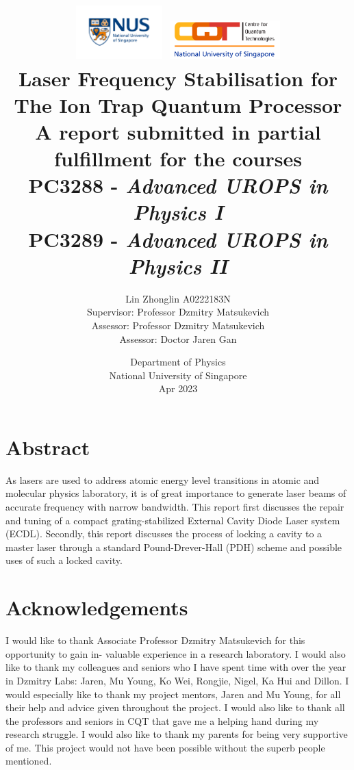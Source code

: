 \documentclass[12pt]{report}
\title{
\includegraphics[width=0.25\textwidth]{nus_logo.jpeg}
\includegraphics[width=0.32\textwidth]{cqt_logo.png}\\
{\LARGE \textbf{Laser Frequency Stabilisation for The Ion Trap Quantum Processor}}\\
\vspace{5mm}
{\normalsize A report submitted in partial fulfillment for the courses}\\
{\normalsize PC3288 - \textit{Advanced UROPS in Physics I}}\\
{\normalsize PC3289 - \textit{Advanced UROPS in Physics II}}
}
\author{
{\normalsize Lin Zhonglin \hspace{10mm} A0222183N}\\
\vspace{1mm}
{\normalsize Supervisor: Professor Dzmitry Matsukevich}\\
{\normalsize Assessor: Professor Dzmitry Matsukevich}\\
{\normalsize Assessor: Doctor Jaren Gan }}\\
\date{{\normalsize Department of Physics}\\
{\normalsize National University of Singapore}\\
{\normalsize Apr 2023}}
\begin{document}
\maketitle

\chapter*{Abstract}
As lasers are used to address atomic energy level transitions in atomic and molecular physics laboratory, it is of great importance to generate laser beams of accurate frequency with narrow bandwidth. This report first discusses the repair and tuning of a compact grating-stabilized External Cavity Diode Laser system (ECDL). Secondly, this report discusses the process of locking a cavity to a master laser through a standard Pound-Drever-Hall (PDH) scheme and possible uses of such a locked cavity. 


\chapter*{Acknowledgements}
I would like to thank Associate Professor Dzmitry Matsukevich for this opportunity to gain in- valuable experience in a research laboratory.
I would also like to thank my colleagues and seniors who I have spent time with over the year in Dzmitry Labs: Jaren, Mu Young, Ko Wei, Rongjie, Nigel, Ka Hui and Dillon. I would especially like to thank my project mentors, Jaren and Mu Young, for all their help and advice given throughout the project. I would also like to thank all the professors and seniors in CQT that gave me a helping hand during my research struggle. 
I would also like to thank my parents for being very supportive of me.
This project would not have been possible without the superb people mentioned.

\tableofcontents
\end{document}
